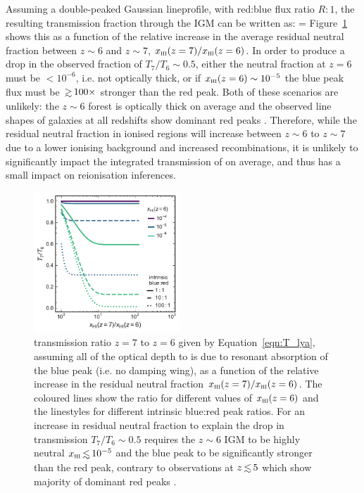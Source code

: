 \documentclass[fleqn,usenatbib]{mnras}
\begin{document}
Assuming a double-peaked Gaussian \lya lineprofile, with red:blue flux ratio $R:1$, the resulting \lya transmission fraction through the IGM can be written as:
%
\BE \label{eqn:T_lya}
 = 
\EE
%
Figure~\ref{fig:T_resonant} shows this as a function of the relative increase in the average residual neutral fraction between $z\sim6$ and $z\sim7$, $\xHI(z=7)/\xHI(z=6)$. In order to produce a drop in the observed \lya fraction of $T_7/T_6 \sim 0.5$, either the neutral fraction at $z=6$ must be $<10^{-6}$, i.e. not optically thick, or if $\xHI(z=6) \sim 10^{-5}$ the blue peak flux must be $\simgt100\times$ stronger than the red peak. Both of these scenarios are unlikely: the $z\sim6$ \lya forest is optically thick on average \citep[e.g,][find $\xHI(z \sim 6) \simgt 10^{-4}$]{Fan2006} and the observed \lya line shapes of galaxies at all redshifts show dominant red peaks \citep[e.g.,][]{Trainor2015,Rivera-Thorsen2015,Yang2017a,Steidel2018}. Therefore, while the residual neutral fraction in ionised regions will increase between $z\sim6$ to $z\sim7$ due to a lower ionising background and increased recombinations, it is unlikely to significantly impact the integrated transmission of \lya on average, and thus has a small impact on reionisation inferences. 

\begin{figure}
    \includegraphics[width=0.49\textwidth]{figs/fig9.pdf}
    \caption{\lya transmission ratio $z=7$ to $z=6$ given by Equation~\eqref{eqn:T_lya}, assuming all of the optical depth to \lya is due to resonant absorption of the blue peak (i.e. no damping wing), as a function of the relative increase in the residual neutral fraction $\xHI(z=7)/\xHI(z=6)$. The coloured lines show the ratio for different values of $\xHI(z=6)$ and the linestyles for different intrinsic blue:red peak ratios. For an increase in residual neutral fraction to explain the drop in \lya transmission $T_7/T_6 \sim 0.5$ requires the $z\sim6$ IGM to be highly neutral $\xHI \simlt 10^{-5}$ and the blue peak to be significantly stronger than the red peak, contrary to observations at $z\simlt5$ which show majority of dominant red peaks \citep[e.g.,][]{Trainor2015,Rivera-Thorsen2015,Yang2017a,Steidel2018}.}
    \label{fig:T_resonant}
\end{figure}
\end{document}
